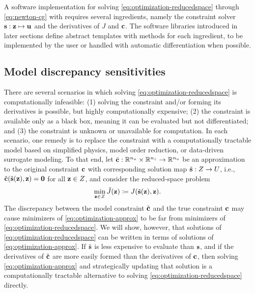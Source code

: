 A software implementation for solving \cref{eq:optimization-reducedspace} through \cref{eq:newton-cg} with  requires several ingredients, namely the constraint solver $\mathbf{s}:\mathbf{z}\mapsto\mathbf{u}$ and the derivatives of $J$ and $\mathbf{c}$.
The software libraries introduced in later sections define abstract templates with methods for each ingredient, to be implemented by the user or handled with automatic differentiation when possible.

\subsection{Model discrepancy sensitivities}
\label{sec:model-discrepancy}

There are several scenarios in which solving \cref{eq:optimization-reducedspace} is computationally infeasible: (1) solving the constraint and/or forming its derivatives is possible, but highly computationally expensive; (2) the constraint is available only as a black box, meaning it can be evaluated but not differentiated; and (3) the constraint is unknown or unavailable for computation.
In each scenario, one remedy is to replace the constraint with a computationally tractable model based on simplified physics, model order reduction, or data-driven surrogate modeling.
To that end, let $\tilde{\mathbf{c}}:\mathbb{R}^{n_u}\times\mathbb{R}^{n_z}\to\mathbb{R}^{n_u}$ be an approximation to the original constraint $\mathbf{c}$ with corresponding solution map $\tilde{\mathbf{s}}:Z\to U$, i.e., $\tilde{\mathbf{c}}(\tilde{\mathbf{s}}(\mathbf{z}), \mathbf{z}) = \mathbf{0}$ for all $\mathbf{z}\in Z$, and consider the reduced-space problem
\begin{align}
    \label{eq:optimization-approx}
    \min_{\mathbf{z}\in Z}
    \tilde{J}(\mathbf{z}) \coloneqq
    J(\tilde{\mathbf{s}}(\mathbf{z}), \mathbf{z}).
\end{align}
The discrepancy between the model constraint $\tilde{\mathbf{c}}$ and the true constraint $\mathbf{c}$ may cause minimizers of \cref{eq:optimization-approx} to be far from minimizers of \cref{eq:optimization-reducedspace}.
We will show, however, that solutions of \cref{eq:optimization-reducedspace} can be written in terms of solutions of \cref{eq:optimization-approx}.
If $\tilde{\mathbf{s}}$ is less expensive to evaluate than $\mathbf{s}$, and if the derivatives of $\tilde{\mathbf{c}}$ are more easily formed than the derivatives of $\mathbf{c}$, then solving \cref{eq:optimization-approx} and strategically updating that solution is a computationally tractable alternative to solving \cref{eq:optimization-reducedspace} directly.

